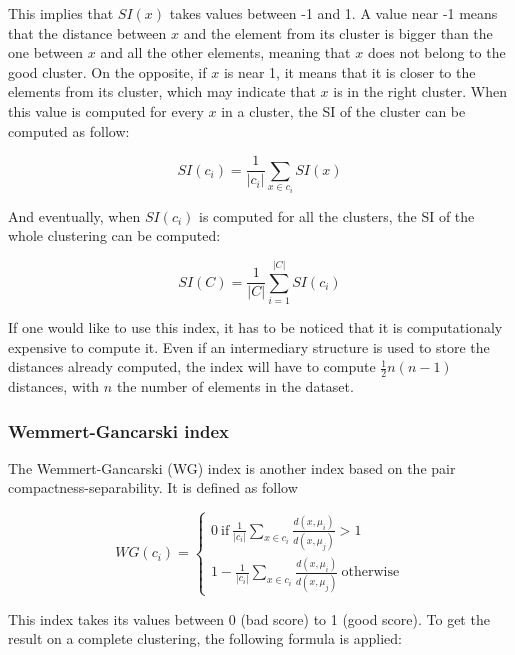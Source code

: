     This implies that $SI(x)$ takes values between -1 and 1. A value near -1 means that the distance between $x$ and the element from its cluster is bigger than the one between $x$ and all the other elements, meaning that $x$ does not belong to the good cluster. On the opposite, if $x$ is near 1, it means that it is closer to the elements from its cluster, which may indicate that $x$ is in the right cluster. When this value is computed for every $x$ in a cluster, the SI of the cluster can be computed as follow:

    \begin{equation}
        SI(c_i) = \frac{1}{|c_i|}\sum_{x \in c_i} SI(x)
        \label{eq:si_ci}
    \end{equation}

    And eventually, when $SI(c_i)$ is computed for all the clusters, the SI of the whole clustering can be computed:

    \begin{equation}
        SI(C) = \frac{1}{|C|}\sum_{i=1}^{|C|} SI(c_i)
        \label{eq:si_clustering}
    \end{equation}

    If one would like to use this index, it has to be noticed that it is computationaly expensive to compute it. Even if an intermediary structure is used to store the distances already computed, the index will have to compute $\frac{1}{2}n(n-1)$ distances, with $n$ the number of elements in the dataset.
    
    \subsubsection{Wemmert-Gancarski index}
    The Wemmert-Gancarski (WG) index is another index based on the pair compactness-separability. It is defined as follow

    \begin{equation}
        WG(c_i) = 
        \begin{cases}
            0 ~ \text{if}\ \frac{1}{|c_i|}\sum_{x \in c_i} \frac{d(x,\mu_i)}{d(x, \mu_j)} > 1\\
            1 - \frac{1}{|c_i|}\sum_{x \in c_i} \frac{d(x,\mu_i)}{d(x, \mu_j)} ~ \text{otherwise}
        \end{cases}
        \label{eq:wg_index}
    \end{equation}

    This index takes its values between 0 (bad score) to 1 (good score). To get the result on a complete clustering, the following formula is applied:

